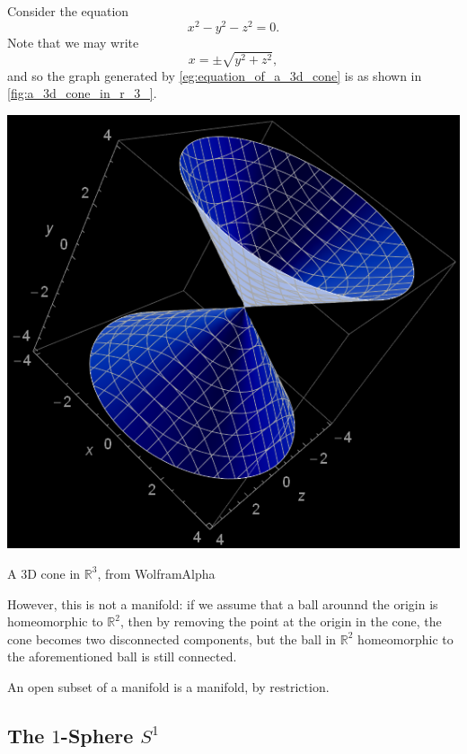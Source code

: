 \documentclass[notoc,notitlepage]{tufte-book}
\begin{document}
\begin{eg}
  Consider the equation
  \begin{equation}\label{eg:equation_of_a_3d_cone}
    x^2 - y^2 - z^2 = 0.
  \end{equation}
  Note that we may write
  \begin{equation*}
    x = \pm \sqrt{ y^2 + z^2 },
  \end{equation*}
  and so the graph generated by \cref{eg:equation_of_a_3d_cone} is as shown in
  \cref{fig:a_3d_cone_in_r_3_}.
  \begin{marginfigure}
    \centering
    \includegraphics[width=\marginparwidth]{3d_cone.png}
    \caption{A 3D cone in $\mathbb{R}^3$, from WolframAlpha}\label{fig:a_3d_cone_in_r_3_}
  \end{marginfigure}
  However, this is not a manifold: if we assume that a ball arounnd the origin
  is homeomorphic to $\mathbb{R}^2$, then by removing the point at the origin
  in the cone, the cone becomes two disconnected components, but the ball in
  $\mathbb{R}^2$ homeomorphic to the aforementioned ball is still connected.
\end{eg}

\begin{note}
  An open subset of a manifold is a manifold, by restriction.
\end{note}

\subsection{The $1$-Sphere $S^1$}%
\label{sub:the_1_sphere_s_1_}
\end{document}
